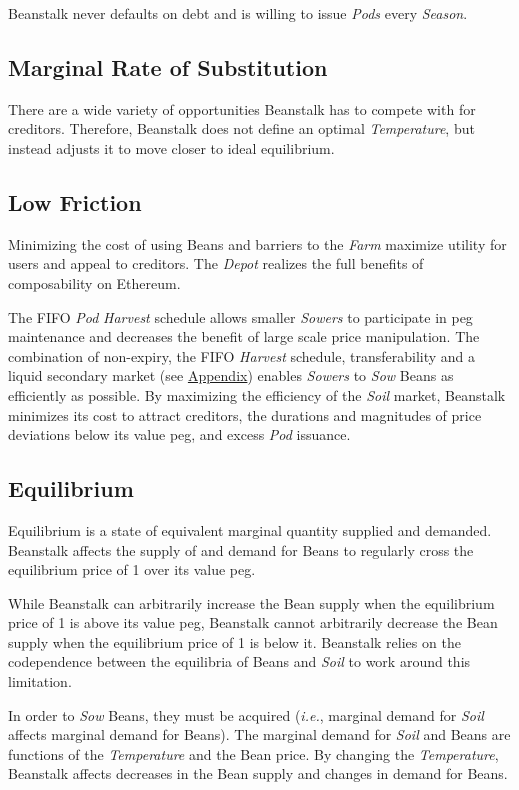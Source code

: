 \documentclass[tikz]{article}
\newcommand{\term}[1]{\textsl{#1}}
\newcommand{\Bean}{} %
\begin{document}
Beanstalk never defaults on debt and is willing to issue \term{Pods} every \term{Season}. 

\subsection{Marginal Rate of Substitution}
There are a wide variety of opportunities Beanstalk has to compete with for creditors. Therefore, Beanstalk does not define an optimal \term{Temperature}, but instead adjusts it to move closer to ideal equilibrium. 

\subsection{Low Friction}
Minimizing the cost of using Beans and barriers to the \term{Farm} maximize utility for users and appeal to creditors. The \term{Depot} realizes the full benefits of composability on Ethereum.

The FIFO \term{Pod} \term{Harvest} schedule allows smaller \term{Sowers} to participate in peg maintenance and decreases the benefit of large scale price manipulation. The combination of non-expiry, the FIFO \term{Harvest} schedule, transferability and a liquid secondary market (see \hyperlink{subsection.14.5}{Appendix}) enables \term{Sowers} to \term{Sow} Beans as efficiently as possible. By maximizing the efficiency of the \term{Soil} market, Beanstalk minimizes its cost to attract creditors, the durations and magnitudes of price deviations below its value peg, and excess \term{Pod} issuance.

\subsection{Equilibrium}
Equilibrium is a state of equivalent marginal quantity supplied and demanded. Beanstalk affects the supply of and demand for Beans to regularly cross the equilibrium price of \Bean1 over its value peg. 

While Beanstalk can arbitrarily increase the Bean supply when the equilibrium price of \Bean1 is above its value peg, Beanstalk cannot arbitrarily decrease the Bean supply when the equilibrium price of \Bean1 is below it. Beanstalk relies on the codependence between the equilibria of Beans and \term{Soil} to work around this limitation. 

In order to \term{Sow} Beans, they must be acquired (\term{i.e.}, marginal demand for \term{Soil} affects marginal demand for Beans). The marginal demand for \term{Soil} and Beans are functions of the \term{Temperature} and the Bean price. By changing the \term{Temperature}, Beanstalk affects decreases in the Bean supply and changes in demand for Beans. 
\end{document}

